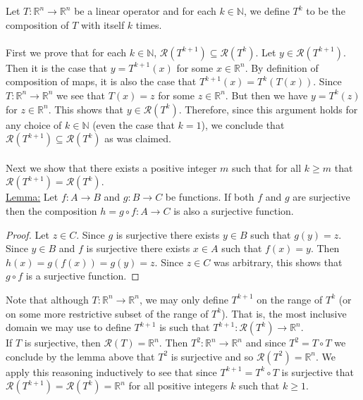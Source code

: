\documentclass[11pt]{article}
\begin{document}
Let $T: \mathbb{R}^n \rightarrow \mathbb{R}^n$ be a linear operator and for each $k \in \mathbb{N}$, we define $T^k$ to be the composition of $T$ with itself $k$ times. \\

\\

First we prove that for each $k \in \mathbb{N}$, $\mathcal{R}(T^{k+1}) \subseteq \mathcal{R}(T^k)$. Let $y \in \mathcal{R}(T^{k+1})$. Then it is the case that $y = T^{k+1}(x)$ for some $x \in \mathbb{R}^n$. By definition of composition of maps, it is also the case that $T^{k+1}(x) = T^k(T(x))$. Since $T :\mathbb{R}^n \rightarrow \mathbb{R}^n$ we see that $T(x) = z$ for some $z \in \mathbb{R}^n$. But then we have $y = T^k(z)$ for $z \in \mathbb{R}^n$. This shows that $y \in \mathcal{R}(T^k)$. Therefore, since this argument holds for any choice of $k \in \mathbb{N}$ (even the case that $k = 1$), we conclude that $\mathcal{R}(T^{k+1}) \subseteq \mathcal{R}(T^k)$ as was claimed.\\

\\

Next we show that there exists a positive integer $m$ such that for all $k \geq m$ that $\mathcal{R}(T^{k+1}) = \mathcal{R}(T^k)$.\\

\underline{Lemma:} Let $f: A \rightarrow B$ and $g : B \rightarrow C$ be functions. If both $f$ and $g$ are surjective then the composition $h = g \circ f: A \rightarrow C$ is also a surjective function.

\begin{proof}
Let $z \in C$. Since $g$ is surjective there exists $y \in B$ such that $g(y) = z$. Since $y \in B$ and $f$ is surjective there exists $x \in A$ such that $f(x) = y$. Then $h(x) = g(f(x)) = g(y) = z$. Since $z \in C$ was arbitrary, this shows that $g \circ f$ is a surjective function.
\end{proof}

Note that although $T:\mathbb{R}^n \rightarrow \mathbb{R}^n$, we may only define $T^{k+1}$ on the range of $T^k$ (or on some more restrictive subset of the range of $T^k$). That is, the most inclusive domain we may use to define $T^{k+1}$ is such that $T^{k+1} : \mathcal{R}(T^k) \rightarrow \mathbb{R}^n$.\\

If $T$ is surjective, then $\mathcal{R}(T) = \mathbb{R}^n$. Then $T^2 : \mathbb{R}^n \rightarrow \mathbb{R}^n$ and since $T^2 = T \circ T$ we conclude by the lemma above that $T^2$ is surjective and so $\mathcal{R}(T^2) = \mathbb{R}^n$. We apply this reasoning inductively to see that since $T^{k+1} = T^k \circ T$ is surjective that $\mathcal{R}(T^{k+1}) = \mathcal{R}(T^{k}) = \mathbb{R}^n$ for all positive integers $k$ such that $k \geq 1$.\\
\end{document}
